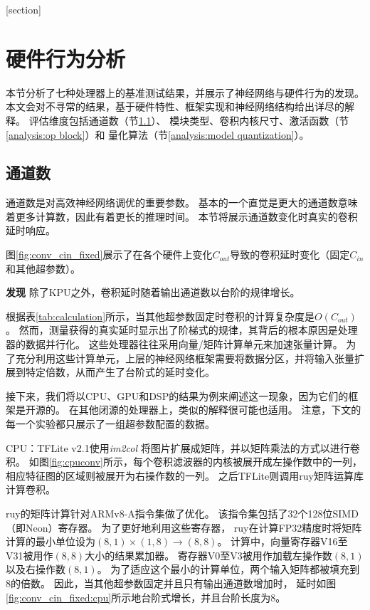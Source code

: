 [section]
\newenvironment{finding}[1][]{
    \refstepcounter{finding}\par
    \medskip\textbf{发现\thefinding#1} 
    \rmfamily}{\medskip}

\section{硬件行为分析}
\label{analysis}
本节分析了七种处理器上的基准测试结果，并展示了神经网络与硬件行为的发现。
本文会对不寻常的结果，基于硬件特性、框架实现和神经网络结构给出详尽的解释。
评估维度包括通道数（节\ref{analysis:channels}）、
模块类型、卷积内核尺寸、激活函数（节\ref{analysis:op block}）和
量化算法（节\ref{analysis:model quantization}）。

\subsection{通道数}
\label{analysis:channels}


通道数是对高效神经网络调优的重要参数。
基本的一个直觉是更大的通道数意味着更多计算数，因此有着更长的推理时间。
本节将展示通道数变化时真实的卷积延时响应。

图\ref{fig:conv_cin_fixed}展示了在各个硬件上变化$C_{out}$导致的卷积延时变化（固定$C_{in}$和其他超参数）。

\begin{finding}
    除了KPU之外，卷积延时随着输出通道数以台阶的规律增长。
\end{finding}

根据表\ref{tab:calculation}所示，当其他超参数固定时卷积的计算复杂度是$O(C_{out})$。
然而，测量获得的真实延时显示出了阶梯式的规律，其背后的根本原因是处理器的数据并行化。
这些处理器往往采用向量/矩阵计算单元来加速张量计算。
为了充分利用这些计算单元，上层的神经网络框架需要将数据分区，并将输入张量扩展到特定倍数，从而产生了台阶式的延时变化。

接下来，我们将以CPU、GPU和DSP的结果为例来阐述这一现象，因为它们的框架是开源的。
在其他闭源的处理器上，类似的解释很可能也适用。
注意，下文的每一个实验都只展示了一组超参数配置的数据。

CPU：TFLite v2.1使用\textit{im2col}\cite{vasudevan2017parallel}
将图片扩展成矩阵，并以矩阵乘法的方式以进行卷积。
如图\ref{fig:cpuconv}所示，每个卷积滤波器的内核被展开成左操作数中的一列，
相应特征图的区域则被展开为右操作数的一列。
之后TFLite则调用ruy\cite{ruy}矩阵运算库计算卷积。

ruy的矩阵计算针对ARMv8-A指令集做了优化。
该指令集包括了32个128位SIMD（即Neon）寄存器\cite{armisa}。
为了更好地利用这些寄存器，
ruy在计算FP32精度时将矩阵计算的最小单位设为$(8,1)\times (1,8)\rightarrow (8,8)$。
计算中，向量寄存器V16至V31被用作$(8,8)$大小的结果累加器。
寄存器V0至V3被用作加载左操作数$(8,1)$以及右操作数$(8,1)$。
为了适应这个最小的计算单位，两个输入矩阵都被填充到8的倍数。
因此，当其他超参数固定并且只有输出通道数增加时，
延时如图\ref{fig:conv_cin_fixed:cpu}所示地台阶式增长，并且台阶长度为8。

